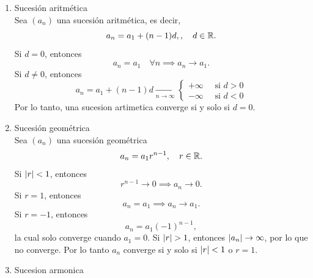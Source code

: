 \documentclass[12pt,a4paper]{article}
\begin{document}
    \begin{solucion}
        \begin{enumerate}
            \item[(a)] Sucesión aritmética\\
            Sea $(a_{n})$ una sucesión aritmética, es decir,
            \begin{equation*}
                a_{n}=a_{1}+(n-1)d,,\quad d\in\mathbb{R}.
            \end{equation*}
            Si $d=0$, entonces
            \begin{equation*}
                a_{n}=a_{1}\quad\forall n\implies a_{n}\to a_{1}.
            \end{equation*}
            Si $d\neq0$, entonces
            \begin{equation*}
                a_{n}=a_{1}+(n-1)d \xrightarrow[n\to\infty]{}
                \begin{cases}
                    +\infty\quad\text{ si }d\gt0\\
                    -\infty\quad\text{ si }d\lt0
                \end{cases}
            \end{equation*}
            Por lo tanto, una sucesion artimetica converge si y solo si
            $d=0$.
            \item[(b)] Sucesión geométrica\\
            Sea $(a_{n})$ una sucesión geométrica
            \begin{equation*}
                a_{n}=a_{1}r^{n-1},\quad r\in\mathbb{R}.
            \end{equation*}
            Si $\abs{r}<1$, entonces
            \begin{equation*}
                r^{n-1}\to0\implies a_{n}\to0.
            \end{equation*}
            Si $r=1$, entonces
            \begin{equation*}
                a_{n}=a_{1}\implies a_{n}\to a_{1}.
            \end{equation*}
            Si $r=-1$, entonces
            \begin{equation*}
                a_{n}=a_{1}(-1)^{n-1},
            \end{equation*}
            la cual solo converge cuando $a_{1}=0$. Si $\abs{r}>1$, entonces $\abs{a_{n}}\to\infty$, por lo que no converge.
            Por lo tanto $a_{n}$ converge si y solo si $\abs{r}<1$ o $r=1$.
            \item[(c)] Sucesion armonica\\

\end{enumerate}
\end{solucion}
\end{document}
